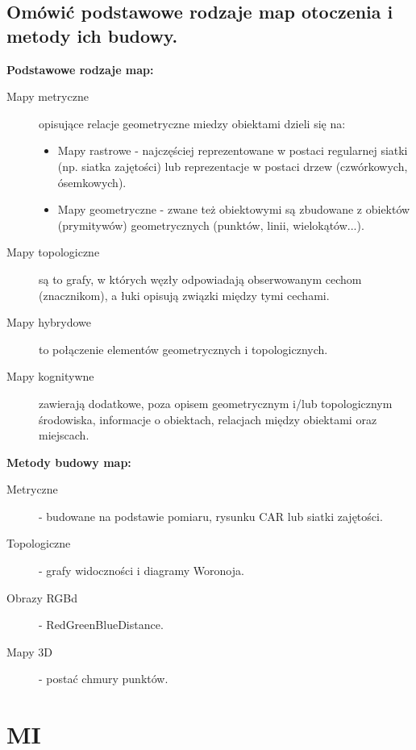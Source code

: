 \subsection{Omówić podstawowe rodzaje map otoczenia i metody ich budowy.}
\textbf{Podstawowe rodzaje map:}
\begin{description}
    \item[Mapy metryczne] opisujące relacje geometryczne miedzy obiektami dzieli się na:\mbox{}
    \begin{itemize}
        \item Mapy rastrowe - najczęściej reprezentowane w postaci regularnej siatki (np. siatka zajętości) lub reprezentacje w postaci drzew (czwórkowych, ósemkowych).
        \item Mapy geometryczne - zwane też obiektowymi są zbudowane z obiektów (prymitywów) geometrycznych (punktów, linii, wielokątów...).
    \end{itemize}
    \item[Mapy topologiczne] są to grafy, w których węzły odpowiadają obserwowanym cechom (znacznikom), a łuki opisują związki między tymi cechami.
    \item[Mapy hybrydowe] to połączenie elementów geometrycznych i topologicznych.
    \item[Mapy kognitywne] zawierają dodatkowe, poza opisem geometrycznym i/lub topologicznym środowiska, informacje o obiektach, relacjach między obiektami oraz miejscach.
\end{description}

\textbf{Metody budowy map:}
\begin{description}
    \item[Metryczne] - budowane na podstawie pomiaru, rysunku CAR lub siatki zajętości.
    \item[Topologiczne] - grafy widoczności i diagramy Woronoja.
    \item[Obrazy RGBd] - RedGreenBlueDistance.
    \item[Mapy 3D] - postać chmury punktów.
\end{description}

\section{MI}
